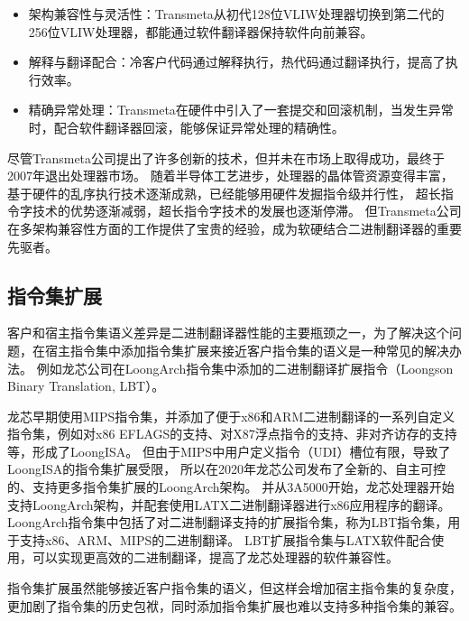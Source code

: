 \begin{itemize}
\item 架构兼容性与灵活性：Transmeta从初代128位VLIW处理器切换到第二代的256位VLIW处理器，都能通过软件翻译器保持软件向前兼容。
\item 解释与翻译配合：冷客户代码通过解释执行，热代码通过翻译执行，提高了执行效率。
\item 精确异常处理：Transmeta在硬件中引入了一套提交和回滚机制，当发生异常时，配合软件翻译器回滚，能够保证异常处理的精确性。
\end{itemize}

尽管Transmeta公司提出了许多创新的技术，但并未在市场上取得成功，最终于2007年退出处理器市场。
随着半导体工艺进步，处理器的晶体管资源变得丰富，基于硬件的乱序执行技术逐渐成熟，已经能够用硬件发掘指令级并行性，
超长指令字技术的优势逐渐减弱，超长指令字技术的发展也逐渐停滞。
但Transmeta公司在多架构兼容性方面的工作提供了宝贵的经验，成为软硬结合二进制翻译器的重要先驱者。

\subsection{指令集扩展}\label{sec:isa_extension}

客户和宿主指令集语义差异是二进制翻译器性能的主要瓶颈之一，为了解决这个问题，在宿主指令集中添加指令集扩展来接近客户指令集的语义是一种常见的解决办法。
例如龙芯公司在LoongArch指令集中添加的二进制翻译扩展指令（Loongson Binary Translation, LBT）\cite{LoongArch2023}。

龙芯早期使用MIPS指令集，并添加了便于x86和ARM二进制翻译的一系列自定义指令集，例如对x86 EFLAGS的支持、对X87浮点指令的支持、非对齐访存的支持等，形成了LoongISA\cite{LoongISA}。
但由于MIPS中用户定义指令（UDI）槽位有限，导致了LoongISA的指令集扩展受限，
所以在2020年龙芯公司发布了全新的、自主可控的、支持更多指令集扩展的LoongArch架构\cite{LoongArch2023}。
并从3A5000开始，龙芯处理器开始支持LoongArch架构，并配套使用LATX二进制翻译器进行x86应用程序的翻译。
LoongArch指令集中包括了对二进制翻译支持的扩展指令集，称为LBT指令集，用于支持x86、ARM、MIPS的二进制翻译。
LBT扩展指令集与LATX软件配合使用，可以实现更高效的二进制翻译，提高了龙芯处理器的软件兼容性。

指令集扩展虽然能够接近客户指令集的语义，但这样会增加宿主指令集的复杂度，更加剧了指令集的历史包袱，同时添加指令集扩展也难以支持多种指令集的兼容。


